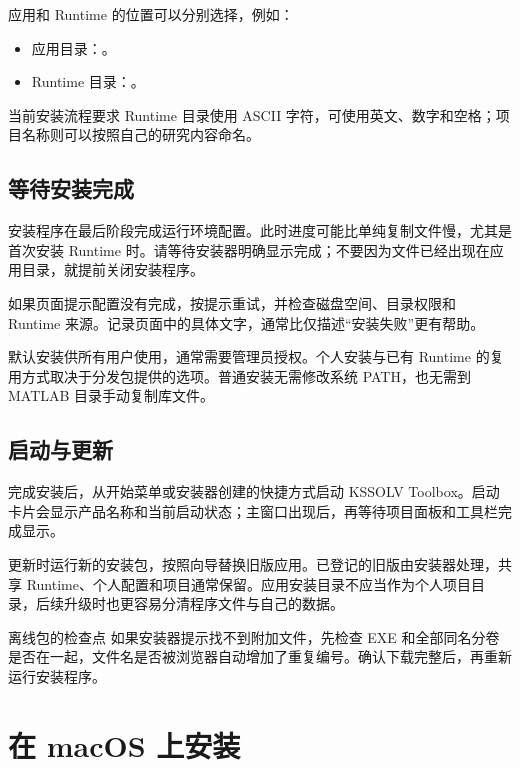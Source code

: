应用和 Runtime 的位置可以分别选择，例如：
\begin{itemize}[nosep]
\item 应用目录：。
\item Runtime 目录：。
\end{itemize}
当前安装流程要求 Runtime 目录使用 ASCII 字符，可使用英文、数字和空格；项目名称则可以按照自己的研究内容命名。


\subsection{等待安装完成}

安装程序在最后阶段完成运行环境配置。此时进度可能比单纯复制文件慢，尤其是首次安装 Runtime 时。请等待安装器明确显示完成；不要因为文件已经出现在应用目录，就提前关闭安装程序。

如果页面提示配置没有完成，按提示重试，并检查磁盘空间、目录权限和 Runtime 来源。记录页面中的具体文字，通常比仅描述“安装失败”更有帮助。

默认安装供所有用户使用，通常需要管理员授权。个人安装与已有 Runtime 的复用方式取决于分发包提供的选项。普通安装无需修改系统 PATH，也无需到 MATLAB\regmark{} 目录手动复制库文件。

\subsection{启动与更新}

完成安装后，从开始菜单或安装器创建的快捷方式启动 KSSOLV Toolbox。启动卡片会显示产品名称和当前启动状态；主窗口出现后，再等待项目面板和工具栏完成显示。

更新时运行新的安装包，按照向导替换旧版应用。已登记的旧版由安装器处理，共享 Runtime、个人配置和项目通常保留。应用安装目录不应当作为个人项目目录，后续升级时也更容易分清程序文件与自己的数据。

\begin{notebox}{离线包的检查点}
如果安装器提示找不到附加文件，先检查 EXE 和全部同名分卷是否在一起，文件名是否被浏览器自动增加了重复编号。确认下载完整后，再重新运行安装程序。
\end{notebox}

\section{在 macOS 上安装}

